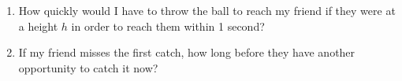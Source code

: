 {\begin{enumerate}
{{			Furthermore, when $u=25\mps$ the first solution $t_-=1$. The second solution $t_+= \frac{25+\sqrt{225}}{10}=4$ seconds. Therefore the time between opportunities to catch is 3 seconds. }}
		\item{How quickly would I have to throw the ball to reach my friend if they were at a height $h$ in order to reach them within 1 second?}
		\item{If my friend misses the first catch, how long before they have another opportunity to catch it now?} 
	\end{enumerate}
}

